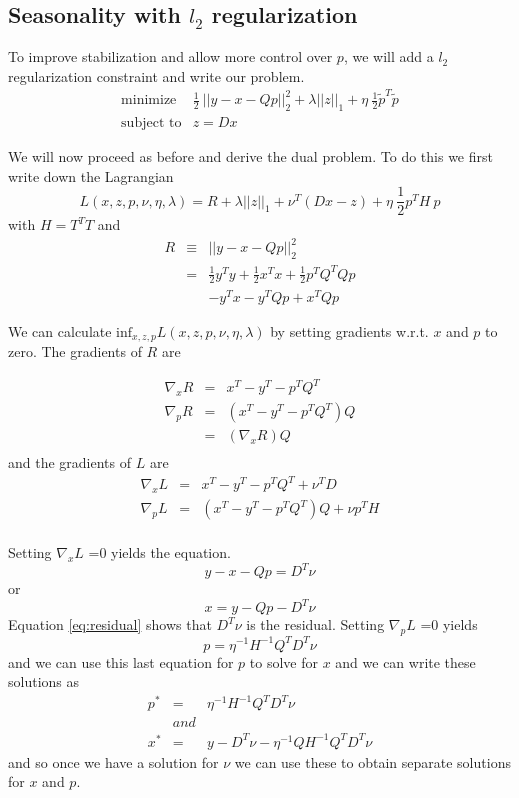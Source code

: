 \documentclass{article}
\begin{document}
\subsection{Seasonality with $l_2$ regularization}

To improve stabilization and allow more control over $p$, we will add
a $l_2$ regularization constraint and write our problem.
\begin{eqnarray}
\mbox{minimize} & \frac{1}{2} ~ || y - x - Q p||_2^2  + \lambda ||z||_1 + \eta ~ \frac{1}{2} \tilde{p}^T \tilde{p}\\
\mbox{subject to} & z = D x
\end{eqnarray}

We will now proceed as before and derive the dual problem. To do this we first
write down the Lagrangian
\[
L(x,z,p,\nu,\eta,\lambda) =  R  + \lambda ||z||_1 + \nu^T (D x -z) + \eta ~ \frac{1}{2} p^T H ~p
\]
with  $H = T^T T$ and
\begin{eqnarray}
R & \equiv & || y - x - Q p||_2^2 \\
& = & \frac{1}{2} y^T y + \frac{1}{2} x^T x + \frac{1}{2} p^T Q^T Q p \\
&  & - y^T x - y^T Q p + x^T Q p
\end{eqnarray}

We can calculate $\mbox{inf}_{x,z,p} L(x,z,p,\nu,\eta,\lambda)$ by setting gradients w.r.t. $x$ and $p$ to zero. The
gradients of $R$ are

\begin{eqnarray}
\nabla_x R &  =  &  x^T - y^T - p^T Q^T\\
\nabla_p R &  =  &  \left( x^T - y^T - p^T Q^T \right) Q \\
& = & \left(\nabla_x R \right) Q \\
\end{eqnarray}
and the gradients of $L$ are
\begin{eqnarray}
\nabla_x L &  =  &  x^T - y^T - p^T Q^T + \nu^T D\\
\nabla_p L &  =  &  \left( x^T - y^T - p^T Q^T \right) Q + \nu p^T H \\
\end{eqnarray}


Setting $\nabla_x L$ =0 yields the equation.
\begin{equation}
y - x - Qp = D^T \nu \label{eq:residual}
\end{equation}
or
\[
x = y - Qp - D^T \nu
\]
Equation \ref{eq:residual} shows that $D^T \nu$ is the residual.
Setting $\nabla_p L$ =0 yields
\[
p = \eta^{-1} H^{-1} Q^T D^T \nu
\]
and we can use this last equation for $p$ to solve for $x$ and we can write these solutions as
\begin{eqnarray}
p^* & = &  \eta^{-1} H^{-1} Q^T D^T \nu \\
& and & \nonumber \\
x^* & = & y - D^T \nu - \eta^{-1} Q H^{-1} Q^T D^T \nu
\end{eqnarray}
and so once we have a solution for $\nu$ we can use these to obtain separate
solutions for $x$ and $p$.
\end{document}
